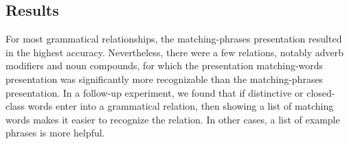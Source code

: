 \documentclass{sigchi}
\begin{document}
\subsection{Results}

For most  grammatical relationships, the matching-phrases presentation resulted in the highest accuracy. Nevertheless, there were a few relations, notably  adverb modifiers and noun compounds,  for which the presentation matching-words presentation was significantly more recognizable than the matching-phrases presentation. In a follow-up experiment, we found that  if distinctive or closed-class words enter into a grammatical relation, then showing a list of matching words makes it easier to recognize the relation. In other cases, a list of example phrases is more helpful.







\end{document}
